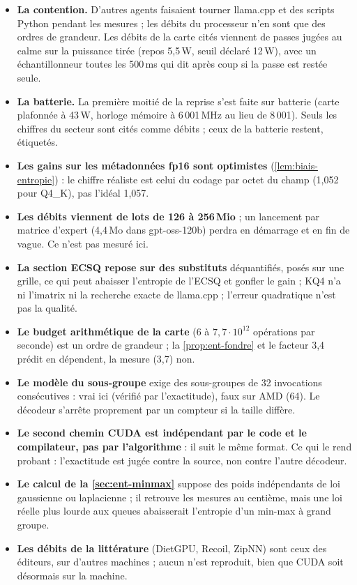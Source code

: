 \begin{faux}
\begin{itemize}
\item \textbf{La contention.} D'autres agents faisaient tourner llama.cpp et des scripts Python pendant les mesures ; les débits du processeur n'en sont que des ordres de grandeur. Les débits de la carte cités viennent de passes jugées au calme sur la puissance tirée (repos 5,5\,W, seuil déclaré 12\,W), avec un échantillonneur toutes les 500\,ms qui dit après coup si la passe est restée seule.
\item \textbf{La batterie.} La première moitié de la reprise s'est faite sur batterie (carte plafonnée à 43\,W, horloge mémoire à 6\,001\,MHz au lieu de 8\,001). Seuls les chiffres du secteur sont cités comme débits ; ceux de la batterie restent, étiquetés.
\item \textbf{Les gains sur les métadonnées fp16 sont optimistes} (\cref{lem:biais-entropie}) : le chiffre réaliste est celui du codage par octet du champ (1,052 pour Q4\_K), pas l'idéal 1,057.
\item \textbf{Les débits viennent de lots de 126 à 256\,Mio} ; un lancement par matrice d'expert (4,4\,Mo dans gpt-oss-120b) perdra en démarrage et en fin de vague. Ce n'est pas mesuré ici.
\item \textbf{La section ECSQ repose sur des substituts} déquantifiés, posés sur une grille, ce qui peut abaisser l'entropie de l'ECSQ et gonfler le gain ; KQ4 n'a ni l'imatrix ni la recherche exacte de llama.cpp ; l'erreur quadratique n'est pas la qualité.
\item \textbf{Le budget arithmétique de la carte} (6 à $7{,}7\cdot10^{12}$ opérations par seconde) est un ordre de grandeur ; la \cref{prop:ent-fondre} et le facteur 3,4 prédit en dépendent, la mesure (3,7) non.
\item \textbf{Le modèle du sous-groupe} exige des sous-groupes de 32 invocations consécutives : vrai ici (vérifié par l'exactitude), faux sur AMD (64). Le décodeur s'arrête proprement par un compteur si la taille diffère.
\item \textbf{Le second chemin CUDA est indépendant par le code et le compilateur, pas par l'algorithme} : il suit le même format. Ce qui le rend probant : l'exactitude est jugée contre la source, non contre l'autre décodeur.
\item \textbf{Le calcul de la \cref{sec:ent-minmax}} suppose des poids indépendants de loi gaussienne ou laplacienne ; il retrouve les mesures au centième, mais une loi réelle plus lourde aux queues abaisserait l'entropie d'un min-max à grand groupe.
\item \textbf{Les débits de la littérature} (DietGPU, Recoil, ZipNN) sont ceux des éditeurs, sur d'autres machines ; aucun n'est reproduit, bien que CUDA soit désormais sur la machine.
\end{itemize}
\end{faux}
